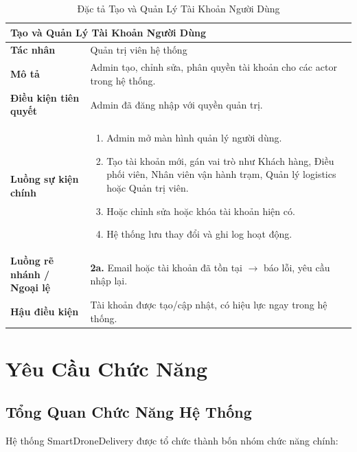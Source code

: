 \begin{table}[H]
  \centering
  \begin{tabularx}{\textwidth}{|l|X|}
    \hline
    \multicolumn{2}{|l|}{\textbf{Tạo và Quản Lý Tài Khoản Người Dùng}} \\
    \hline
    \textbf{Tác nhân}           & Quản trị viên hệ thống \\ \hline
    \textbf{Mô tả}              & Admin tạo, chỉnh sửa, phân quyền tài khoản cho các actor trong hệ thống. \\ \hline
    \textbf{Điều kiện tiên quyết} & Admin đã đăng nhập với quyền quản trị. \\ \hline
    \textbf{Luồng sự kiện chính} &
      \begin{enumerate}[leftmargin=*, nosep, topsep=0pt]
        \item Admin mở màn hình quản lý người dùng.
        \item Tạo tài khoản mới, gán vai trò như Khách hàng, Điều phối viên, Nhân viên vận hành trạm, Quản lý logistics hoặc Quản trị viên.
        \item Hoặc chỉnh sửa hoặc khóa tài khoản hiện có.
        \item Hệ thống lưu thay đổi và ghi log hoạt động.
      \end{enumerate} \\ \hline
    \textbf{Luồng rẽ nhánh / Ngoại lệ} &
      \textbf{2a.} Email hoặc tài khoản đã tồn tại $\rightarrow$ báo lỗi, yêu cầu nhập lại. \\ \hline
    \textbf{Hậu điều kiện}      & Tài khoản được tạo/cập nhật, có hiệu lực ngay trong hệ thống. \\
    \hline
  \end{tabularx}
  \caption{Đặc tả Tạo và Quản Lý Tài Khoản Người Dùng}
  \label{tab:uc12}
\end{table}

\section{Yêu Cầu Chức Năng}

\subsection{Tổng Quan Chức Năng Hệ Thống}

Hệ thống SmartDroneDelivery được tổ chức thành bốn nhóm chức năng chính:

